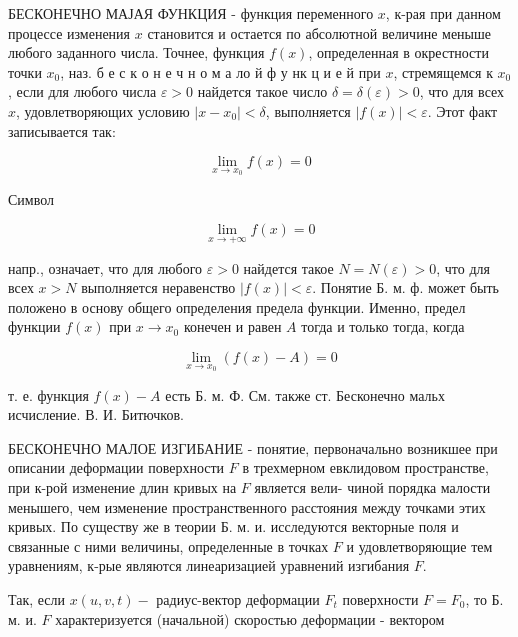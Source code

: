 \documentclass[10pt]{article}
\begin{document}
БЕСКОНЕЧНО МАЈАЯ ФУНКЦИЯ - функция переменного $x$, к-рая при данном процессе изменения $x$ становится и остается по абсолютной величине меныше любого заданного числа. Точнее, функция $f(x)$, определенная в окрестности точки $x_{0}$, наз. б е с к о н е ч н о м а ло й ф у нк ц и е й при $x$, стремящемся к $x_{0}$, если для любого числа $\varepsilon>0$ найдется такое число $\delta=\delta(\varepsilon)>0$, что для всех $x$, удовлетворяющих условию $\left|x-x_{0}\right|<\delta$, выполняется $|f(x)|<\varepsilon$. Этот факт записывается так:



\[

\lim _{x \rightarrow x_{0}} f(x)=0

\]



Символ



\[

\lim _{x \rightarrow+\infty} f(x)=0

\]



напр., означает, что для любого $\varepsilon>0$ найдется такое $N=N(\varepsilon)>0$, что для всех $x>N$ выполняется неравенство $|f(x)|<\varepsilon$. Понятие Б. м. ф. может быть положено в основу общего определения предела функции. Именно, предел функции $f(x)$ при $x \rightarrow x_{0}$ конечен и равен $A$ тогда и только тогда, когда



\[

\lim _{x \rightarrow x_{0}}(f(x)-A)=0

\]



т. е. функция $f(x)-A$ есть Б. м. Ф. См. также ст. Бесконечно мальх исчисление. В. И. Битючков.



БЕСКОНЕЧНО МАЛОЕ ИЗГИБАНИЕ - понятие, первоначально возникшее при описании деформации поверхности $F$ в трехмерном евклидовом пространстве, при к-рой изменение длин кривых на $F$ является вели- чиной порядка малости менышего, чем изменение пространственного расстояния между точками этих кривых. По существу же в теории Б. м. и. исследуются векторные поля и связанные с ними величины, определенные в точках $F$ и удовлетворяющие тем уравнениям, к-рые являются линеаризацией уравнений изгибания $F$.



Так, если $x(u, v, t)-$ радиус-вектор деформации $F_{t}$ поверхности $F=F_{0}$, то Б. м. и. $F$ характеризуется (начальной) скоростью деформации - вектором
\end{document}
